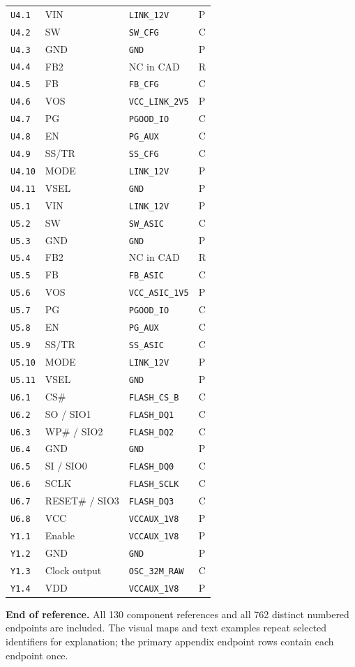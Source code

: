 \documentclass[11pt,a4paper]{article}
\begin{document}
\begin{longtable}{@{}P{25mm}P{55mm}P{73mm}P{10mm}@{}}
\nolinkurl{U4.1} & VIN & \nolinkurl{LINK_12V} & P \\
\nolinkurl{U4.2} & SW & \nolinkurl{SW_CFG} & C \\
\nolinkurl{U4.3} & GND & \nolinkurl{GND} & P \\
\nolinkurl{U4.4} & FB2 & NC in CAD & R \\
\nolinkurl{U4.5} & FB & \nolinkurl{FB_CFG} & C \\
\nolinkurl{U4.6} & VOS & \nolinkurl{VCC_LINK_2V5} & P \\
\nolinkurl{U4.7} & PG & \nolinkurl{PGOOD_IO} & C \\
\nolinkurl{U4.8} & EN & \nolinkurl{PG_AUX} & C \\
\nolinkurl{U4.9} & SS/TR & \nolinkurl{SS_CFG} & C \\
\nolinkurl{U4.10} & MODE & \nolinkurl{LINK_12V} & P \\
\nolinkurl{U4.11} & VSEL & \nolinkurl{GND} & P \\
\nolinkurl{U5.1} & VIN & \nolinkurl{LINK_12V} & P \\
\nolinkurl{U5.2} & SW & \nolinkurl{SW_ASIC} & C \\
\nolinkurl{U5.3} & GND & \nolinkurl{GND} & P \\
\nolinkurl{U5.4} & FB2 & NC in CAD & R \\
\nolinkurl{U5.5} & FB & \nolinkurl{FB_ASIC} & C \\
\nolinkurl{U5.6} & VOS & \nolinkurl{VCC_ASIC_1V5} & P \\
\nolinkurl{U5.7} & PG & \nolinkurl{PGOOD_IO} & C \\
\nolinkurl{U5.8} & EN & \nolinkurl{PG_AUX} & C \\
\nolinkurl{U5.9} & SS/TR & \nolinkurl{SS_ASIC} & C \\
\nolinkurl{U5.10} & MODE & \nolinkurl{LINK_12V} & P \\
\nolinkurl{U5.11} & VSEL & \nolinkurl{GND} & P \\
\nolinkurl{U6.1} & CS\# & \nolinkurl{FLASH_CS_B} & C \\
\nolinkurl{U6.2} & SO / SIO1 & \nolinkurl{FLASH_DQ1} & C \\
\nolinkurl{U6.3} & WP\# / SIO2 & \nolinkurl{FLASH_DQ2} & C \\
\nolinkurl{U6.4} & GND & \nolinkurl{GND} & P \\
\nolinkurl{U6.5} & SI / SIO0 & \nolinkurl{FLASH_DQ0} & C \\
\nolinkurl{U6.6} & SCLK & \nolinkurl{FLASH_SCLK} & C \\
\nolinkurl{U6.7} & RESET\# / SIO3 & \nolinkurl{FLASH_DQ3} & C \\
\nolinkurl{U6.8} & VCC & \nolinkurl{VCCAUX_1V8} & P \\
\nolinkurl{Y1.1} & Enable & \nolinkurl{VCCAUX_1V8} & P \\
\nolinkurl{Y1.2} & GND & \nolinkurl{GND} & P \\
\nolinkurl{Y1.3} & Clock output & \nolinkurl{OSC_32M_RAW} & C \\
\nolinkurl{Y1.4} & VDD & \nolinkurl{VCCAUX_1V8} & P \\
\end{longtable}\endgroup

\vfill\textbf{End of reference.} All 130 component references and all 762 distinct numbered endpoints are included. The visual maps and text examples repeat selected identifiers for explanation; the primary appendix endpoint rows contain each endpoint once.
\end{document}
